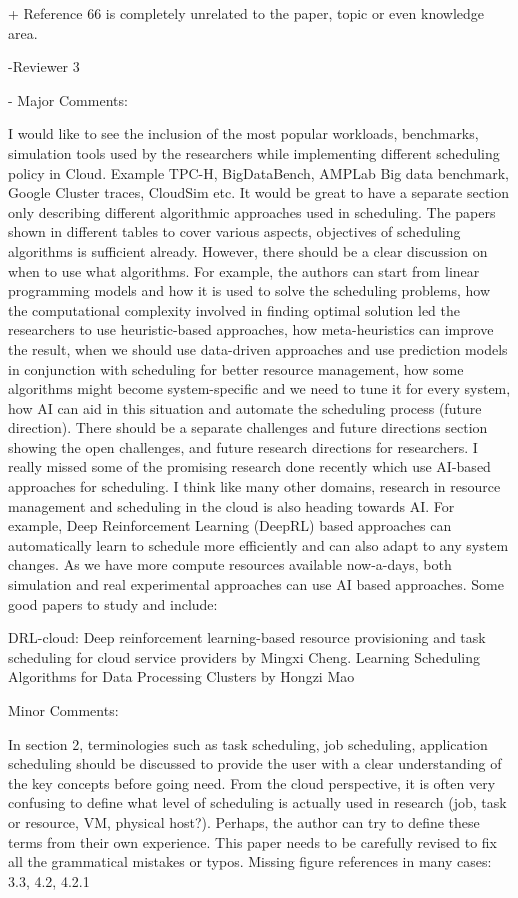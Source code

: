 + Reference 66 is completely unrelated to the paper, topic or even knowledge area.


-Reviewer 3

  -
Major Comments:

    I would like to see the inclusion of the most popular workloads, benchmarks, simulation tools used by the researchers while implementing different scheduling policy in Cloud. Example TPC-H, BigDataBench, AMPLab Big data benchmark, Google Cluster traces, CloudSim etc.
    It would be great to have a separate section only describing different algorithmic approaches used in scheduling. The papers shown in different tables to cover various aspects, objectives of scheduling algorithms is sufficient already. However, there should be a clear discussion on when to use what algorithms. For example, the authors can start from linear programming models and how it is used to solve the scheduling problems, how the computational complexity involved in finding optimal solution led the researchers to use heuristic-based approaches, how meta-heuristics can improve the result, when we should use data-driven approaches and use prediction models in conjunction with scheduling for better resource management, how some algorithms might become system-specific and we need to tune it for every system, how AI can aid in this situation and automate the scheduling process (future direction).
    There should be a separate challenges and future directions section showing the open challenges, and future research directions for researchers.
    I really missed some of the promising research done recently which use AI-based approaches for scheduling. I think like many other domains, research in resource management and scheduling in the cloud is also heading towards AI. For example, Deep Reinforcement Learning (DeepRL) based approaches can automatically learn to schedule more efficiently and can also adapt to any system changes. As we have more compute resources available now-a-days, both simulation and real experimental approaches can use AI based approaches. Some good papers to study and include: 


    DRL-cloud: Deep reinforcement learning-based resource provisioning and task scheduling for cloud service providers by Mingxi Cheng.
    Learning Scheduling Algorithms for Data Processing Clusters by Hongzi Mao


Minor Comments:

    In section 2, terminologies such as task scheduling, job scheduling, application scheduling should be discussed to provide the user with a clear understanding of the key concepts before going need. From the cloud perspective, it is often very confusing to define what level of scheduling is actually used in research (job, task or resource, VM, physical host?). Perhaps, the author can try to define these terms from their own experience.
    This paper needs to be carefully revised to fix all the grammatical mistakes or typos.
    Missing figure references in many cases: 3.3, 4.2, 4.2.1


